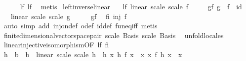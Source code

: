 \begin{isabellebody}
\ \ \ \ \isamarkupfalse%
\ lf\ lf{\isacharprime}{\kern0pt}\ \isamarkupfalse%
\ metis\isanewline
{}\isamarkupfalse%
%
\endisatagproof
{\isafoldproof}%
%
\isadelimproof
\isanewline
%
\endisadelimproof
\isanewline
{}\isamarkupfalse%
\ left{\isacharunderscore}{\kern0pt}inverse{\isacharunderscore}{\kern0pt}linear{\isacharcolon}{\kern0pt}\isanewline
\ \ \ lf{\isacharcolon}{\kern0pt}\ {\isachardoublequoteopen}linear\ scale\ scale\ f{\isachardoublequoteclose}\isanewline
\ \ \ \ \ gf{\isacharcolon}{\kern0pt}\ {\isachardoublequoteopen}g\ {\isasymcirc}\ f\ {\isacharequal}{\kern0pt}\ id{\isachardoublequoteclose}\isanewline
\ \ \ {\isachardoublequoteopen}linear\ scale\ scale\ g{\isachardoublequoteclose}\isanewline
%
\isadelimproof
%
\endisadelimproof
%
\isatagproof
{}\isamarkupfalse%
\ {\isacharminus}{\kern0pt}\isanewline
\ \ \isamarkupfalse%
\ gf\ \isamarkupfalse%
\ fi{\isacharcolon}{\kern0pt}\ {\isachardoublequoteopen}inj\ f{\isachardoublequoteclose}\isanewline
\ \ \ \ \isamarkupfalse%
\ {\isacharparenleft}{\kern0pt}auto\ simp\ add{\isacharcolon}{\kern0pt}\ inj{\isacharunderscore}{\kern0pt}on{\isacharunderscore}{\kern0pt}def\ o{\isacharunderscore}{\kern0pt}def\ id{\isacharunderscore}{\kern0pt}def\ fun{\isacharunderscore}{\kern0pt}eq{\isacharunderscore}{\kern0pt}iff{\isacharparenright}{\kern0pt}\ metis\isanewline
\ \ \isamarkupfalse%
\ finite{\isacharunderscore}{\kern0pt}dimensional{\isacharunderscore}{\kern0pt}vector{\isacharunderscore}{\kern0pt}space{\isacharunderscore}{\kern0pt}pair\ scale\ Basis\ scale\ Basis\ \isamarkupfalse%
\ unfold{\isacharunderscore}{\kern0pt}locales\isanewline
\ \ \isamarkupfalse%
\ linear{\isacharunderscore}{\kern0pt}injective{\isacharunderscore}{\kern0pt}isomorphism{\isacharbrackleft}{\kern0pt}OF\ lf\ fi{\isacharbrackright}{\kern0pt}\isanewline
\ \ \isamarkupfalse%
\ h\ {\isacharcolon}{\kern0pt}{\isacharcolon}{\kern0pt}\ {\isachardoublequoteopen}{\isacharprime}{\kern0pt}b\ {\isasymRightarrow}\ {\isacharprime}{\kern0pt}b{\isachardoublequoteclose}\ \ {\isachardoublequoteopen}linear\ scale\ scale\ h{\isachardoublequoteclose}\ \ h{\isacharcolon}{\kern0pt}\ {\isachardoublequoteopen}{\isasymforall}x{\isachardot}{\kern0pt}\ h\ {\isacharparenleft}{\kern0pt}f\ x{\isacharparenright}{\kern0pt}\ {\isacharequal}{\kern0pt}\ x{\isachardoublequoteclose}\ {\isachardoublequoteopen}{\isasymforall}x{\isachardot}{\kern0pt}\ f\ {\isacharparenleft}{\kern0pt}h\ x{\isacharparenright}{\kern0pt}\ {\isacharequal}{\kern0pt}\ x{\isachardoublequoteclose}\isanewline

\end{isabellebody}
